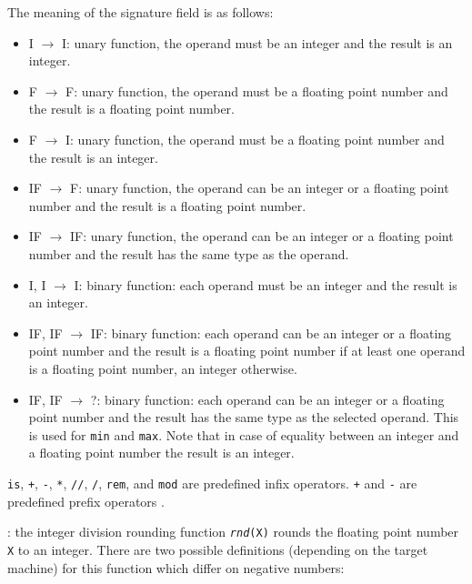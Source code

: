 The meaning of the signature field is as follows:

\begin{itemize}

\item I $\rightarrow$ I: unary function, the operand must be an integer and
the result is an integer.

\item F $\rightarrow$ F: unary function, the operand must be a floating
point number and the result is a floating point number.

\item F $\rightarrow$ I: unary function, the operand must be a floating
point number and the result is an integer.

\item IF $\rightarrow$ F: unary function, the operand can be an integer or a
floating point number and the result is a floating point number.

\item IF $\rightarrow$ IF: unary function, the operand can be an integer or
a floating point number and the result has the same type as the operand.

\item I, I $\rightarrow$ I: binary function: each operand must be an integer
and the result is an integer.

\item IF, IF $\rightarrow$ IF: binary function: each operand can be an
integer or a floating point number and the result is a floating point number
if at least one operand is a floating point number, an integer otherwise.

\item IF, IF $\rightarrow$ ?: binary function: each operand can be an
integer or a floating point number and the result has the same type as the
selected operand. This is used for \texttt{min} and \texttt{max}. Note that
in case of equality between an integer and a floating point number the
result is an integer.

\end{itemize}

\texttt{is}, \texttt{+}, \texttt{-}, \texttt{*}, \texttt{//}, \texttt{/},
\texttt{rem}, and \texttt{mod} are predefined infix operators. \texttt{+}
and \texttt{-} are predefined prefix operators .

: the integer division rounding
function \texttt{\textit{rnd}(X)} rounds the floating point number
\texttt{X} to an integer. There are two possible definitions (depending on
the target machine) for this function which differ on negative numbers:

